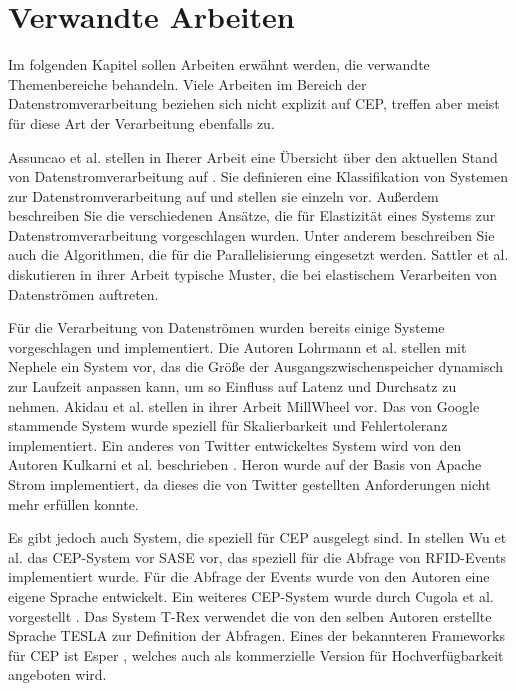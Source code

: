 \chapter{Verwandte Arbeiten}
Im folgenden Kapitel sollen Arbeiten erwähnt werden, die verwandte Themenbereiche behandeln.
Viele Arbeiten im Bereich der Datenstromverarbeitung beziehen sich nicht explizit auf CEP, treffen aber meist für diese Art der Verarbeitung ebenfalls zu.

Assuncao et al. stellen in Iherer Arbeit eine Übersicht über den aktuellen Stand von Datenstromverarbeitung auf \cite{de_assuncao_distributed_2017}.
Sie definieren eine Klassifikation von Systemen zur Datenstromverarbeitung auf und stellen sie einzeln vor.
Außerdem beschreiben Sie die verschiedenen Ansätze, die für Elastizität eines Systems zur Datenstromverarbeitung vorgeschlagen wurden.
Unter anderem beschreiben Sie auch die Algorithmen, die für die Parallelisierung eingesetzt werden.
Sattler et al. \cite{sattler_towards_2013} diskutieren in ihrer Arbeit typische Muster, die bei elastischem Verarbeiten von Datenströmen auftreten.

Für die Verarbeitung von Datenströmen wurden bereits einige Systeme vorgeschlagen und implementiert.
Die Autoren Lohrmann et al. \cite{lohrmann_nephele_2014} stellen mit Nephele ein System vor, das die Größe der Ausgangszwischenspeicher dynamisch zur Laufzeit anpassen kann, um so Einfluss auf Latenz und Durchsatz zu nehmen.
Akidau et al. \cite{akidau_millwheel:_2013} stellen in ihrer Arbeit MillWheel vor.
Das von Google stammende System wurde speziell für Skalierbarkeit und Fehlertoleranz implementiert.
Ein anderes von Twitter entwickeltes System wird von den Autoren Kulkarni et al. beschrieben \cite{kulkarni_twitter_2015}.
Heron wurde auf der Basis von Apache Strom implementiert, da dieses die von Twitter gestellten Anforderungen nicht mehr erfüllen konnte.

Es gibt jedoch auch System, die speziell für CEP ausgelegt sind.
In \cite{wu_high-performance_2006} stellen Wu et al. das CEP-System vor SASE vor, das speziell für die Abfrage von RFID-Events implementiert wurde.
Für die Abfrage der Events wurde von den Autoren eine eigene Sprache entwickelt.
Ein weiteres CEP-System wurde durch Cugola et al. vorgestellt \cite{cugola_complex_2012}.
Das System T-Rex verwendet die von den selben Autoren erstellte Sprache TESLA \cite{cugola_tesla:_2010} zur Definition der Abfragen. 
Eines der bekannteren Frameworks für CEP ist Esper \cite{noauthor_home_nodate}, welches auch als kommerzielle Version für Hochverfügbarkeit angeboten wird.

